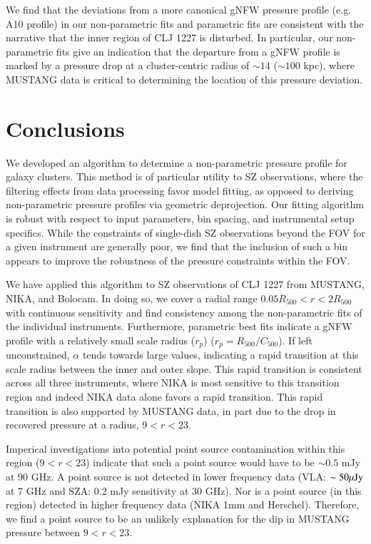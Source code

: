 \documentclass[twocolumn,traditabstract]{aa}
\begin{document}
We find that the deviations from a more canonical gNFW pressure profile (e.g. A10 profile) in our
non-parametric fits and parametric fits are consistent with the narrative that the inner region of
CLJ 1227 is disturbed. In particular, our non-parametric fits give an indication that the departure
from a gNFW profile is marked by a pressure drop at a cluster-centric radius of $\sim 14$\asecs
($\sim 100$ kpc), where MUSTANG data is critical to determining the location of this pressure deviation.

\section{Conclusions}
\label{sec:conclusions}

We developed an algorithm to determine a non-parametric pressure profile for galaxy clusters.
This method is of particular utility to SZ observations, where the filtering effects from data
processing favor model fitting, as opposed to deriving non-parametric pressure profiles via
geometric deprojection. Our fitting algorithm is robust with respect to input parameters,
bin spacing, and instrumental setup specifics. While the constraints of single-dish SZ observations
beyond the FOV for a given instrument are generally poor, we find that the inclusion of such a bin
appears to improve the robustness of the pressure constraints within the FOV.

We have applied this algorithm to SZ observations of CLJ 1227 from MUSTANG, NIKA, and Bolocam.
In doing so, we cover a radial range $0.05 R_{500} < r < 2 R_{500}$ with continuous sensitivity
and find consistency among the non-parametric fits of the individual instruments. Furthermore,
parametric best fits indicate a gNFW profile with a relatively small scale radius ($r_p$)
($r_p = R_{500}/C_{500}$). If left unconstrained, $\alpha$ tends towards large values, indicating
a rapid transition at this scale radius between the inner and outer slope. This rapid transition
is consistent across all three instruments, where NIKA is most sensitive to this transition
region and indeed NIKA data alone favors a rapid transition. This rapid transition is also
supported by MUSTANG data, in part due to the drop in recovered pressure at a radius,
$9$\asecs $< r < 23$\asec.

Imperical investigations into potential point source contamination within this region ($9$\asec $< r < 23$\asec)
indicate that such a point source would have to be $\sim 0.5$ mJy at 90 GHz. A point source is not detected in lower frequency data
(VLA: $\sim 50 {\rm \mu Jy}$ at 7 GHz and SZA: 0.2 mJy sensitivity at 30 GHz). Nor is a point source (in this region) detected
in higher frequency data (NIKA 1mm and Herschel). Therefore, we find a point source to be an unlikely explanation for
the dip in MUSTANG pressure between $9$\asecs $< r < 23$\asec.
\end{document}
